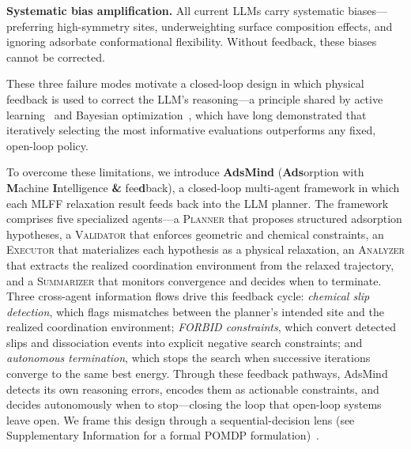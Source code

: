 \textbf{Systematic bias amplification.}
All current LLMs carry systematic biases---preferring high-symmetry sites, underweighting surface composition effects, and ignoring adsorbate conformational flexibility. Without feedback, these biases cannot be corrected.

These three failure modes motivate a closed-loop design in which physical feedback is used to correct the LLM's reasoning---a principle shared by active learning~\cite{settles2012active} and Bayesian optimization~\cite{snoek2012practical}, which have long demonstrated that iteratively selecting the most informative evaluations outperforms any fixed, open-loop policy.

To overcome these limitations, we introduce \textbf{AdsMind} (\textbf{Ads}orption with \textbf{M}achine \textbf{I}ntelligence \textbf{\&} fee\textbf{d}back), a closed-loop multi-agent framework in which each MLFF relaxation result feeds back into the LLM planner.
The framework comprises five specialized agents---a \textsc{Planner} that proposes structured adsorption hypotheses, a \textsc{Validator} that enforces geometric and chemical constraints, an \textsc{Executor} that materializes each hypothesis as a physical relaxation, an \textsc{Analyzer} that extracts the realized coordination environment from the relaxed trajectory, and a \textsc{Summarizer} that monitors convergence and decides when to terminate.
Three cross-agent information flows drive this feedback cycle: \textit{chemical slip detection}, which flags mismatches between the planner's intended site and the realized coordination environment; \textit{FORBID constraints}, which convert detected slips and dissociation events into explicit negative search constraints; and \textit{autonomous termination}, which stops the search when successive iterations converge to the same best energy.
Through these feedback pathways, AdsMind detects its own reasoning errors, encodes them as actionable constraints, and decides autonomously when to stop---closing the loop that open-loop systems leave open.
We frame this design through a sequential-decision lens (see Supplementary Information for a formal POMDP formulation)~\cite{kochenderfer2015decision,astrom1965optimal,sutton2018reinforcement}.

